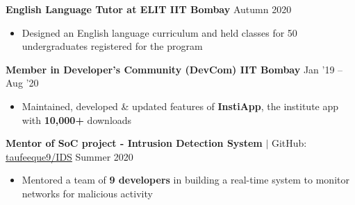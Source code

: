 \textbf{English Language Tutor at ELIT IIT Bombay} \hfill{Autumn 2020}\\
\begin{itemize}[topsep = -0.5mm, itemsep = -0.75 mm, leftmargin=*]
\item Designed an English language curriculum and held classes for 50 undergraduates registered for the program
\end{itemize}
\vspace{3pt}
\textbf{Member in Developer's Community (DevCom) IIT Bombay} \hfill{Jan '19 -- Aug '20}\\
\begin{itemize}[topsep = -0.5mm, itemsep = -0.75 mm, leftmargin=*]
\item Maintained, developed \& updated features of \textbf{InstiApp}, the institute app with \textbf{10,000+} downloads
\end{itemize}
\vspace{3pt}
\textbf{Mentor of SoC project - Intrusion Detection System} $|$ GitHub: \href{https://github.com/taufeeque9/IDS}{taufeeque9/IDS} \hfill{Summer 2020}\\
\begin{itemize}[topsep = -0.5mm, itemsep = -0.75 mm, leftmargin=*]
\item Mentored a team of \textbf{9 developers} in building a real-time system to monitor networks for malicious activity
\end{itemize}


